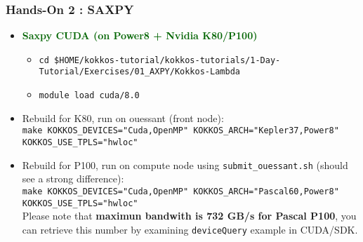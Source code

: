 \begin{frame}[fragile=singleslide]
  \frametitle{Hands-On 2 : SAXPY}

  \begin{itemize}
  \item \textcolor{darkgreen}{\textbf{Saxpy CUDA (on Power8 + Nvidia K80/P100)}}
    \begin{itemize}
    \item \texttt{cd \$HOME/kokkos-tutorial/kokkos-tutorials/1-Day-Tutorial/Exercises/01\_AXPY/Kokkos-Lambda}
    \item \texttt{module load cuda/8.0}
    \end{itemize}
  \item Rebuild for K80, run on ouessant (front node):\\
    \texttt{make KOKKOS\_DEVICES="Cuda,OpenMP" KOKKOS\_ARCH="Kepler37,Power8" KOKKOS\_USE\_TPLS="hwloc"}
  \item Rebuild for P100, run on compute node using \texttt{submit\_ouessant.sh} (should see a strong difference):\\
    \texttt{make KOKKOS\_DEVICES="Cuda,OpenMP" KOKKOS\_ARCH="Pascal60,Power8" KOKKOS\_USE\_TPLS="hwloc"}\\
    Please note that \textbf{maximun bandwith is 732 GB/s for Pascal P100}, you can retrieve this number by examining \texttt{deviceQuery} example in CUDA/SDK.
  \end{itemize}
\end{frame}

